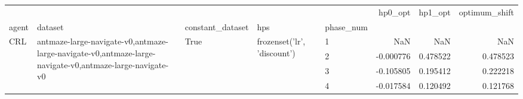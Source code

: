 \begin{tabular}{lllllrrr}
\toprule
 &  &  &  &  & hp0_opt & hp1_opt & optimum_shift \\
agent & dataset & constant_dataset & hps & phase_num &  &  &  \\
\midrule
\multirow[t]{4}{*}{CRL} & \multirow[t]{4}{*}{antmaze-large-navigate-v0,antmaze-large-navigate-v0,antmaze-large-navigate-v0,antmaze-large-navigate-v0} & \multirow[t]{4}{*}{True} & \multirow[t]{4}{*}{frozenset({'lr', 'discount'})} & 1 & NaN & NaN & NaN \\
 &  &  &  & 2 & -0.000776 & 0.478522 & 0.478523 \\
 &  &  &  & 3 & -0.105805 & 0.195412 & 0.222218 \\
 &  &  &  & 4 & -0.017584 & 0.120492 & 0.121768 \\
\cline{1-8} \cline{2-8} \cline{3-8} \cline{4-8}
\bottomrule
\end{tabular}
